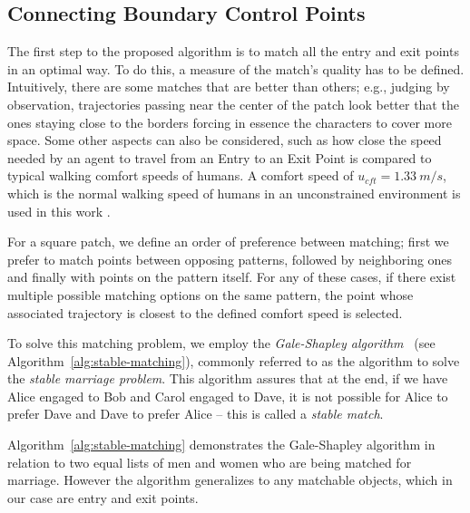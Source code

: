 \subsection{Connecting Boundary Control Points}
\label{sec:method:init}

The first step to the proposed algorithm is to match all the entry and exit points in an optimal way.
To do this, a measure of the match's quality has to be defined.
Intuitively, there are some matches that are better than others; e.g., judging by observation, trajectories passing near the center of the patch look better that the ones staying close to the borders forcing in essence the characters to cover more space.
Some other aspects can also be considered, such as how close the speed needed by an agent to travel from an Entry to an Exit Point is compared to typical walking comfort speeds of humans.
A comfort speed of $u_{cft} = 1.33~m/s$, which is the normal walking speed of humans in an unconstrained environment is used in this work \cite{Whittle2003Gait}.

For a square patch, we define an order of preference between matching; first we prefer to match points between opposing patterns, followed by neighboring ones and finally with points on the pattern itself.
For any of these cases, if there exist multiple possible matching options on the same pattern, the point whose associated trajectory is closest to the defined comfort speed is selected.

To solve this matching problem, we employ the \emph{Gale-Shapley algorithm}~\cite{gale1962college} (see Algorithm~\ref{alg:stable-matching}), commonly referred to as the algorithm to solve the \emph{stable marriage problem}. 
This algorithm assures that at the end, if we have Alice engaged to Bob and Carol engaged to Dave, it is not possible for Alice to prefer Dave and Dave to prefer Alice -- this is called a \emph{stable match}.  

Algorithm~\ref{alg:stable-matching} demonstrates the Gale-Shapley algorithm in relation to two equal lists of men and women who are being matched for marriage.
However the algorithm generalizes to any matchable objects, which in our case are entry and exit points.

